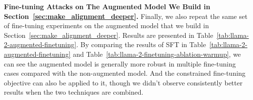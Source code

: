 \textbf{Fine-tuning Attacks on The Augmented Model We Build in Section~\ref{sec:make_alignment_deeper}.} Finally, we also repeat the same set of fine-tuning experiments on the augmented model that we build in Section~\ref{sec:make_alignment_deeper}. Results are presented in Table~\ref{tab:llama-2-augmented-finetuning}. By comparing the results of SFT in Table~\ref{tab:llama-2-augmented-finetuning} and Table~\ref{tab:llama-2-finetuning-ablation-warmup}, we can see the augmented model is generally more robust in multiple fine-tuning cases compared with the non-augmented model. And the constrained fine-tuning objective can also be applied to it, though we didn't observe consistently better results when the two techniques are combined.







